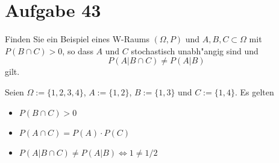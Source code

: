 \section{Aufgabe 43}
\setcounter{section}{43}

Finden Sie ein Beispiel eines W-Raums $(\Omega, P)$ und $A, B, C \subset
\Omega$ mit $P(B \cap C) > 0$, so dass $A$ und $C$ stochastisch unabh"angig
sind und $$P(A|B \cap C) \neq P(A|B)$$ gilt.

Seien $\Omega := \{1, 2, 3, 4\}$, $A := \{1, 2\}$, $B := \{1, 3\}$ und $C := \{1, 4\}$. Es gelten
\begin{itemize}[-]
    \item $P(B \cap C) > 0$
    \item $P(A \cap C) = P(A) \cdot P(C)$
    \item $P(A | B \cap C) \neq P(A | B) \iff 1 \neq 1/2$
\end{itemize}
